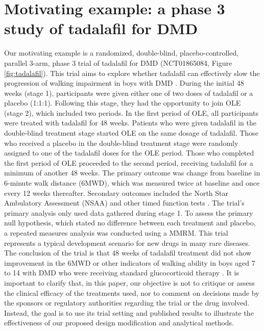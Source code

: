 \section{Motivating example: a phase 3 study of tadalafil for DMD}
\label{sec:example_longitudinal}
Our motivating example is a randomized, double-blind, placebo-controlled, parallel 3-arm, phase 3 trial of tadalafil for \ac{DMD} (NCT01865084, Figure \ref{fig:tadalafil}). This trial aims to explore whether tadalafil can effectively slow the progression of walking impairment in boys with \ac{DMD} . During the initial 48 weeks (stage 1), participants were given either one of two doses of tadalafil or a placebo (1:1:1). Following this stage, they had the opportunity to join \ac{OLE} (stage 2), which included two periods. In the first period of OLE, all participants were treated with tadalafil for 48 weeks. Patients who were given tadalafil in the double-blind treatment stage started \ac{OLE} on the same dosage of tadalafil. Those who received a placebo in the double-blind treatment stage were randomly assigned to one of the tadalafil doses for the \ac{OLE} period. Those who completed the first period of \ac{OLE} proceeded to the second period, receiving tadalafil for a minimum of another 48 weeks. The primary outcome was change from baseline in 6-minute walk distance (\ac{6MWD}), which was measured twice at baseline and once every 12 weeks thereafter. Secondary outcomes included the North Star Ambulatory Assessment (\ac{NSAA}) and other timed function tests \citep{victor2017phase}. The trial's primary analysis only used data gathered during stage 1. To assess the primary null hypothesis, which stated no difference between each treatment and placebo, a repeated measures analysis was conducted using a \ac{MMRM}. This trial represents a typical development scenario for new drugs in many rare diseases. The conclusion of the trial is that 48 weeks of tadalafil treatment did not show improvement in the \ac{6MWD} or other indicators of walking ability in boys aged 7 to 14 with \ac{DMD} who were receiving standard glucocorticoid therapy \citep{victor2017phase}. It is important to clarify that, in this paper, our objective is not to critique or assess the clinical efficacy of the treatments used, nor to comment on decisions made by the sponsors or regulatory authorities regarding the trial or the drug involved. Instead, the goal is to use its trial setting and published results to illustrate the effectiveness of our proposed design modification and analytical methods. 

